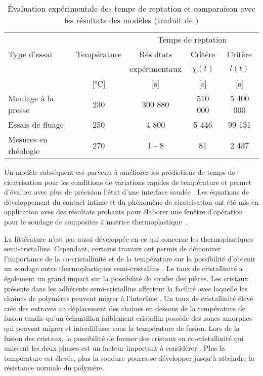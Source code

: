 \begin{table}[h]
	\centering
	\caption{Évaluation expérimentale des temps de reptation et comparaison avec les résultats des modèles (traduit de \cite{Bastien1991})}
	\label{tab:temps_de_reptation_Bastien}
	\begin{tabular}{@{}lcccc@{}}
		\toprule
		& \multicolumn{1}{l}{} &          \multicolumn{3}{c}{Temps de reptation}          \\
		Type d'essai         &          Température &      Résultats &          Critère &  Critère \\
		&                      &   expérimentaux & $\chi(t)$ & $l(t)$ \\
		&      [\si{\celsius}] & [\si{\second}] &   [\si{\second}] &       [\si{\second}] \\ \midrule
		Moulage à la presse  &                  230 &        300 880 &          510 000 &            5 400 000 \\
		Essais de fluage     &                  250 &           4 800 &             5 446 &               99 131 \\
		Mesures en rhéologie &                  270 &          1 - 8 &               81 &                 2 437 \\ \bottomrule
	\end{tabular}%
\end{table}

Un modèle subséquent est parvenu à améliorer les prédictions de temps de cicatrisation pour les conditions de variations rapides de température et permet d'évaluer avec plus de précision l'état d'une interface soudée \cite{F.Yang2002}. 
Les équations de développement du contact intime et du phénomène de cicatrisation ont été mis en application avec des résultats probants pour élaborer une fenêtre d'opération pour le soudage de composites à matrice thermoplastique~\cite{Ageorges1998}. 

La littérature n'est pas aussi développée en ce qui concerne les thermoplastiques semi-cristallins. 
Cependant, certains travaux ont permis de démontrer l'importance de la co-cristallinité et de la température sur la possibilité d'obtenir un soudage entre thermoplastiques semi-cristallins  \cite{Xue1998,Smith2001}. 
Le taux de cristallinité a également un grand impact sur la possibilité de souder des pièces. 
Les cristaux présents dans les adhérents semi-cristallins affectent la facilité avec laquelle les chaînes de polymères peuvent migrer à l'interface \cite{Jarrousse2004}. 
Un taux de cristallinité élevé crée des entraves au déplacement des chaînes en dessous de la température de fusion tandis qu'un échantillon faiblement cristallin possède des zones amorphes qui peuvent migrer et interdiffuser sous la température de fusion. 
Lors de la fusion des cristaux, la possibilité de former des cristaux en co-cristallinité qui unissent les deux phases est un facteur important à considérer \cite{Smith2001,Zanetto2001}. 
Plus la température est élevée, plus la soudure pourra se développer jusqu'à atteindre la résistance normale du polymère. 

